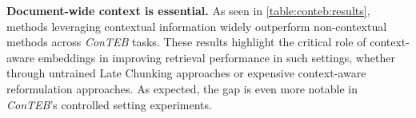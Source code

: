 





%
\noindent\textbf{Document-wide context is essential.} As seen in \autoref{table:conteb:results}, methods leveraging contextual information widely outperform non-contextual methods across \emph{ConTEB} tasks. These results highlight the critical role of context-aware embeddings in improving retrieval performance in such settings, whether through untrained Late Chunking approaches or expensive context-aware reformulation approaches. 
As expected, the gap is even more notable in \emph{ConTEB}'s controlled setting experiments. 


